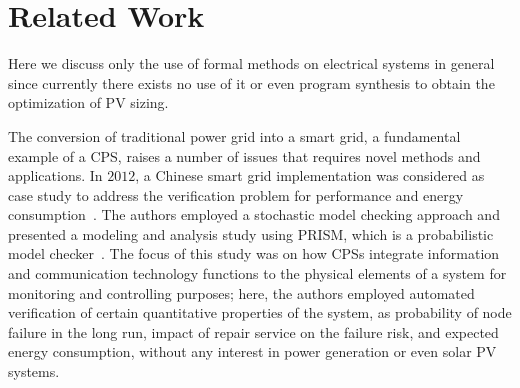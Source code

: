  
\section{Related Work}

Here we discuss only the use of formal methods on electrical systems in general since currently there exists no use of it or even program synthesis to obtain the optimization of PV sizing.

The conversion of traditional power grid into a smart grid, a fundamental example of a CPS, 
raises a number of issues that requires novel methods and applications. In $2012$, a Chinese smart grid implementation was considered as case study to address the verification problem for performance and energy consumption~\cite{Yukseletall2012}. The authors employed a stochastic model checking approach and presented a modeling and analysis study using PRISM, which is a probabilistic model checker~\cite{KwiatkowskaNP11}. The focus of this study was on how CPSs integrate information and communication technology functions to the physical elements of a system for monitoring and controlling purposes; here, the authors employed automated verification of certain quantitative properties of the system, as probability of	 node failure in the long run, impact of repair service on the failure risk, and expected energy consumption, without any interest in power generation or even solar PV systems.

